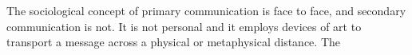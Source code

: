 

The sociological concept of primary communication is face to face, and
secondary communication is not.  It is not personal and it employs
devices of art to transport a message across a physical or
metaphysical distance.  The 

\bye
